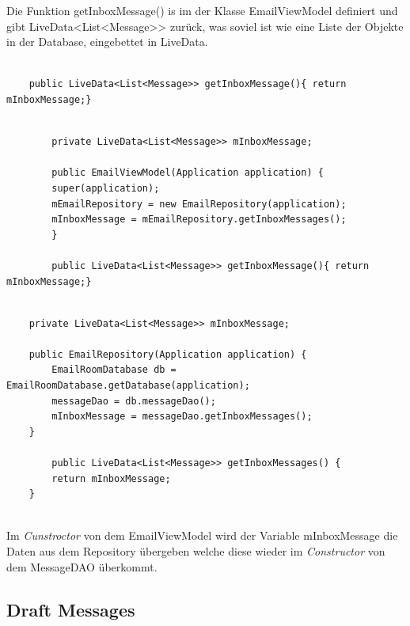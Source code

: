 \documentclass[a4paper,11pt]{article}
\begin{document}
Die Funktion getInboxMessage() is im der Klasse EmailViewModel definiert und gibt LiveData<List<Message>> zurück, was soviel ist wie eine Liste der Objekte in der Database, eingebettet 
in LiveData.

\lstset{language=java}
\begin{lstlisting}

    public LiveData<List<Message>> getInboxMessage(){ return mInboxMessage;}

\end{lstlisting}

\lstset{language=java}
\begin{lstlisting}

        private LiveData<List<Message>> mInboxMessage;

        public EmailViewModel(Application application) {
        super(application);
        mEmailRepository = new EmailRepository(application);
        mInboxMessage = mEmailRepository.getInboxMessages();
        }

        public LiveData<List<Message>> getInboxMessage(){ return mInboxMessage;}

\end{lstlisting}


\lstset{language=java}
\begin{lstlisting}

    private LiveData<List<Message>> mInboxMessage;

    public EmailRepository(Application application) {
        EmailRoomDatabase db = EmailRoomDatabase.getDatabase(application);
        messageDao = db.messageDao();
        mInboxMessage = messageDao.getInboxMessages();
    }

        public LiveData<List<Message>> getInboxMessages() {
        return mInboxMessage;
    }


\end{lstlisting}

Im \textit{Cunstroctor} von dem EmailViewModel wird der Variable mInboxMessage die Daten aus dem Repository übergeben welche diese wieder im \textit{Constructor} von dem MessageDAO überkommt.

\newpage

\subsection{Draft Messages}

\begingroup
\setlength{\intextsep}{3pt}
\setlength{\columnsep}{4pt}
\end{document}
